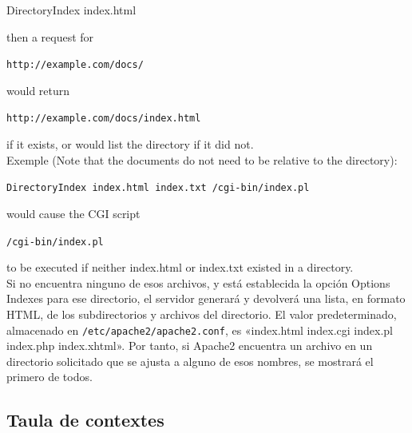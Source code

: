 \documentclass[a4paper, 11pt]{article}
\begin{document}
	DirectoryIndex index.html 

then a request for 

\verb+http://example.com/docs/+ 

would return 

\verb+http://example.com/docs/index.html+ 

if it exists, or would list the directory if it did not.\\
Exemple (Note that the documents do not need to be relative to the directory):

	\verb+DirectoryIndex index.html index.txt /cgi-bin/index.pl+

would cause the CGI script 

\verb+/cgi-bin/index.pl+ 

to be executed if neither index.html or index.txt existed in a directory.\\
Si no encuentra ninguno de esos archivos, y está establecida la opción Options Indexes para ese directorio, el servidor generará y devolverá una lista, en formato HTML, de los subdirectorios y archivos del directorio. El valor predeterminado, almacenado en \verb+/etc/apache2/apache2.conf+, es «index.html index.cgi index.pl index.php index.xhtml». Por tanto, si Apache2 encuentra un archivo en un directorio solicitado que se ajusta a alguno de esos nombres, se mostrará el primero de todos. 

\subsection{Taula de contextes}
\end{document}
